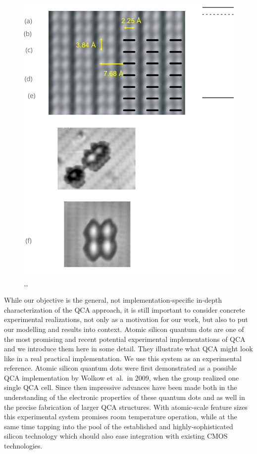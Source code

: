 \begin{figure}
  \center
  \includegraphics{silicon}
  \caption{\ldots}
  \label{fig:silicon}
\end{figure}


While our objective is the general, not implementation-specific in-depth
characterization of the QCA approach, it is still important to consider concrete
experimental realizations, not only as a motivation for our work, but also to
put our modelling and results into context. Atomic silicon quantum dots are one
of the most promising and recent potential experimental implementations of QCA
and we introduce them here in some detail. They illustrate what QCA might look
like in a real practical implementation. We use this system as an experimental
reference. Atomic silicon quantum dots were first demonstrated as a possible QCA
implementation by Wolkow et~al.\ in 2009, when the group realized one single QCA
cell. Since then impressive advances have been made both in the understanding of
the electronic properties of these quantum dots and as well in the precise
fabrication of larger QCA structures. With atomic-scale feature sizes this
experimental system promises room temperature operation, while at the same time
tapping into the pool of the established and highly-sophisticated silicon
technology which should also ease integration with existing CMOS technologies.

